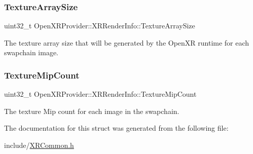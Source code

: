 \subsubsection{\texorpdfstring{TextureArraySize}{TextureArraySize}}
{\footnotesize\ttfamily uint32\+\_\+t Open\+X\+R\+Provider\+::\+X\+R\+Render\+Info\+::\+Texture\+Array\+Size}



The texture array size that will be generated by the Open\+XR runtime for each swapchain image. 

\mbox{\label{struct_open_x_r_provider_1_1_x_r_render_info_ad86a33b90d0f38aa11a3cd4e0dc521b4}} 
\subsubsection{\texorpdfstring{TextureMipCount}{TextureMipCount}}
{\footnotesize\ttfamily uint32\+\_\+t Open\+X\+R\+Provider\+::\+X\+R\+Render\+Info\+::\+Texture\+Mip\+Count}



The texture Mip count for each image in the swapchain. 



The documentation for this struct was generated from the following file\+:\begin{DoxyCompactItemize}
\item 
include/\mbox{\hyperlink{_x_r_common_8h}{X\+R\+Common.\+h}}\end{DoxyCompactItemize}
